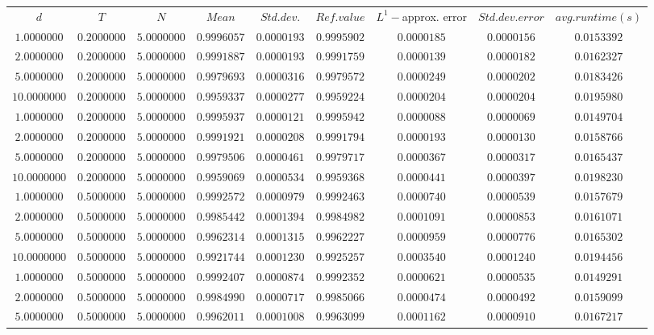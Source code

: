 \begin{tabular}{ccccccccc}
$d$ & $T$ & $N$ & $Mean$ & $Std. dev.$ & $Ref. value$ & $L^1-$approx. error & $Std. dev. error$ & $avg. runtime (s)$\\
$1.0000000$ & $0.2000000$ & $5.0000000$ & $0.9996057$ & $0.0000193$ & $0.9995902$ & $0.0000185$ & $0.0000156$ & $0.0153392$\\
$2.0000000$ & $0.2000000$ & $5.0000000$ & $0.9991887$ & $0.0000193$ & $0.9991759$ & $0.0000139$ & $0.0000182$ & $0.0162327$\\
$5.0000000$ & $0.2000000$ & $5.0000000$ & $0.9979693$ & $0.0000316$ & $0.9979572$ & $0.0000249$ & $0.0000202$ & $0.0183426$\\
$10.0000000$ & $0.2000000$ & $5.0000000$ & $0.9959337$ & $0.0000277$ & $0.9959224$ & $0.0000204$ & $0.0000204$ & $0.0195980$\\
$1.0000000$ & $0.2000000$ & $5.0000000$ & $0.9995937$ & $0.0000121$ & $0.9995942$ & $0.0000088$ & $0.0000069$ & $0.0149704$\\
$2.0000000$ & $0.2000000$ & $5.0000000$ & $0.9991921$ & $0.0000208$ & $0.9991794$ & $0.0000193$ & $0.0000130$ & $0.0158766$\\
$5.0000000$ & $0.2000000$ & $5.0000000$ & $0.9979506$ & $0.0000461$ & $0.9979717$ & $0.0000367$ & $0.0000317$ & $0.0165437$\\
$10.0000000$ & $0.2000000$ & $5.0000000$ & $0.9959069$ & $0.0000534$ & $0.9959368$ & $0.0000441$ & $0.0000397$ & $0.0198230$\\
$1.0000000$ & $0.5000000$ & $5.0000000$ & $0.9992572$ & $0.0000979$ & $0.9992463$ & $0.0000740$ & $0.0000539$ & $0.0157679$\\
$2.0000000$ & $0.5000000$ & $5.0000000$ & $0.9985442$ & $0.0001394$ & $0.9984982$ & $0.0001091$ & $0.0000853$ & $0.0161071$\\
$5.0000000$ & $0.5000000$ & $5.0000000$ & $0.9962314$ & $0.0001315$ & $0.9962227$ & $0.0000959$ & $0.0000776$ & $0.0165302$\\
$10.0000000$ & $0.5000000$ & $5.0000000$ & $0.9921744$ & $0.0001230$ & $0.9925257$ & $0.0003540$ & $0.0001240$ & $0.0194456$\\
$1.0000000$ & $0.5000000$ & $5.0000000$ & $0.9992407$ & $0.0000874$ & $0.9992352$ & $0.0000621$ & $0.0000535$ & $0.0149291$\\
$2.0000000$ & $0.5000000$ & $5.0000000$ & $0.9984990$ & $0.0000717$ & $0.9985066$ & $0.0000474$ & $0.0000492$ & $0.0159099$\\
$5.0000000$ & $0.5000000$ & $5.0000000$ & $0.9962011$ & $0.0001008$ & $0.9963099$ & $0.0001162$ & $0.0000910$ & $0.0167217$\\

\end{tabular}
